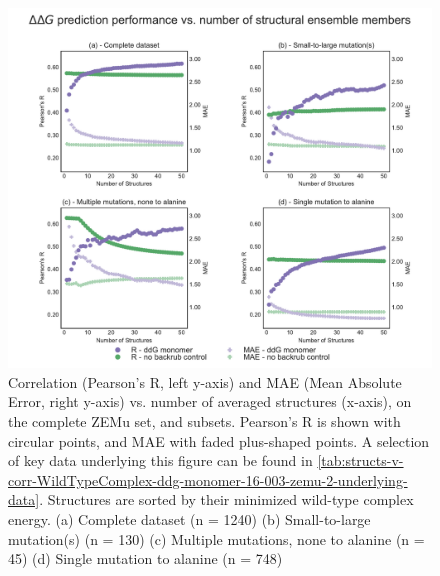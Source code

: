 \begin{figure}
  \includegraphics[width=\textwidth,keepaspectratio]{structs-v-corr-WildTypeComplex-ddg-monomer-16-003-zemu-2.pdf}
  \caption[]{ %
    Correlation (Pearson's R, left y-axis) and MAE (Mean Absolute Error, right y-axis) vs. number of averaged structures (x-axis), on the complete ZEMu set, and subsets.
    Pearson's R is shown with circular points, and MAE with faded plus-shaped points.
    A selection of key data underlying this figure can be found in \cref{tab:structs-v-corr-WildTypeComplex-ddg-monomer-16-003-zemu-2-underlying-data}.
    Structures are sorted by their minimized wild-type complex energy. 
    (a) Complete dataset (n = 1240)
    (b) Small-to-large mutation(s) (n = 130)
    (c) Multiple mutations, none to alanine (n = 45)
    (d) Single mutation to alanine (n = 748)
  } \label{fig:structs-v-corr-WildTypeComplex-ddg-monomer-16-003-zemu-2}
\end{figure}
